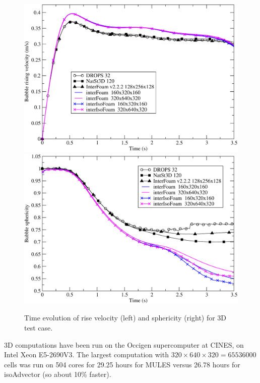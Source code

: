 \documentclass[review]{elsarticle}
\begin{document}
\begin{figure}[!h]
  \centering
  \includegraphics[scale=0.333]{figures/bubble_velocity3D.pdf}
  \hspace{0.8cm}
  \includegraphics[scale=0.333]{figures/bubble_sphericity3D.pdf}
  \caption{Time evolution of rise velocity (left) and sphericity (right) for 3D test case. }
  \label{fig:4}
\end{figure}

3D computations have been run on the Occigen supercomputer at CINES, on Intel 
Xeon E5-2690V3. The largest computation with 
$320 \times 640 \times 320 = 65 536 000$ cells was run on 504 cores for 29.25 hours for
MULES versus 26.78 hours for isoAdvector (so about 10\% faster). 


\end{document}
